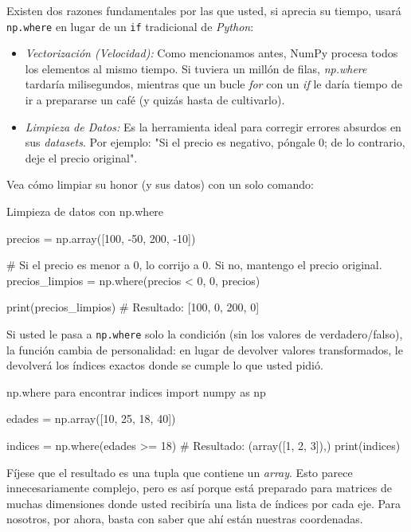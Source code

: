 Existen dos razones fundamentales por las que usted, si aprecia su tiempo, usará \texttt{np.where} en lugar de un \texttt{if} tradicional de \textit{Python}:
\begin{itemize}
\item \textit{Vectorización (Velocidad):} Como mencionamos antes, NumPy procesa todos los elementos al mismo tiempo. Si tuviera un millón de filas, \textit{np.where} tardaría milisegundos, mientras que un bucle \textit{for} con un \textit{if} le daría tiempo de ir a prepararse un café (y quizás hasta de cultivarlo).
\item \textit{Limpieza de Datos:} Es la herramienta ideal para corregir errores absurdos en sus \textit{datasets}. Por ejemplo: "Si el precio es negativo, póngale 0; de lo contrario, deje el precio original".
\end{itemize}

Vea cómo limpiar su honor (y sus datos) con un solo comando:
\begin{pycode}{Limpieza de datos con np.where}

precios = np.array([100, -50, 200, -10])

# Si el precio es menor a 0, lo corrijo a 0. Si no, mantengo el precio original.
precios_limpios = np.where(precios < 0, 0, precios)

print(precios_limpios) # Resultado: [100, 0, 200, 0]
\end{pycode}

Si usted le pasa a \texttt{np.where} solo la condición (sin los valores de verdadero/falso), la función cambia de personalidad: en lugar de devolver valores transformados, le devolverá los índices exactos donde se cumple lo que usted pidió.

\begin{pycode}{np.where para encontrar indices}
import numpy as np

edades = np.array([10, 25, 18, 40])

indices = np.where(edades >= 18) # Resultado: (array([1, 2, 3]),)
print(indices)
\end{pycode}

\begin{nota}
Fíjese que el resultado es una tupla que contiene un \textit{array}. Esto parece innecesariamente complejo, pero es así porque está preparado para matrices de muchas dimensiones donde usted recibiría una lista de índices por cada eje. Para nosotros, por ahora, basta con saber que ahí están nuestras coordenadas.
\end{nota}